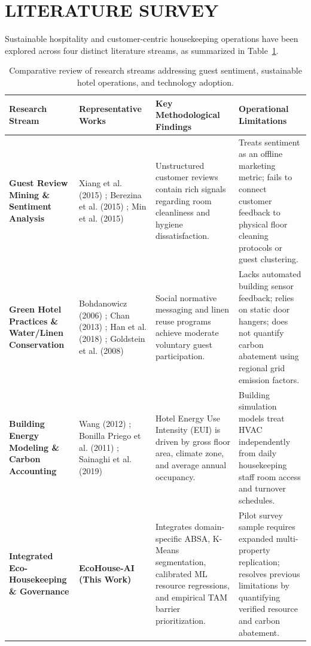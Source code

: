 \documentclass[11pt,a4paper]{article}
\begin{document}
\section{LITERATURE SURVEY}

Sustainable hospitality and customer-centric housekeeping operations have been explored across four distinct literature streams, as summarized in Table~\ref{tab:literature_review_matrix}.

\begin{table}[t]
\centering
\small
\caption{Comparative review of research streams addressing guest sentiment, sustainable hotel operations, and technology adoption.}
\label{tab:literature_review_matrix}
\begin{tabularx}{\textwidth}{>{\raggedright\arraybackslash}p{2.6cm} >{\raggedright\arraybackslash}p{3.0cm} X X}
\toprule
\textbf{Research Stream} & \textbf{Representative Works} & \textbf{Key Methodological Findings} & \textbf{Operational Limitations} \\
\midrule
\textbf{Guest Review Mining \& Sentiment Analysis} & 
Xiang et al. (2015) \cite{xiang2015}; Berezina et al. (2015) \cite{berezina2015}; Min et al. (2015) \cite{min2015} & 
Unstructured customer reviews contain rich signals regarding room cleanliness and hygiene dissatisfaction. & 
Treats sentiment as an offline marketing metric; fails to connect customer feedback to physical floor cleaning protocols or guest clustering. \\
\addlinespace
\textbf{Green Hotel Practices \& Water/Linen Conservation} & 
Bohdanowicz (2006) \cite{bohdanowicz2006}; Chan (2013) \cite{chan2013}; Han et al. (2018) \cite{han2018}; Goldstein et al. (2008) \cite{goldstein2008} & 
Social normative messaging and linen reuse programs achieve moderate voluntary guest participation. & 
Lacks automated building sensor feedback; relies on static door hangers; does not quantify carbon abatement using regional grid emission factors. \\
\addlinespace
\textbf{Building Energy Modeling \& Carbon Accounting} & 
Wang (2012) \cite{wang2012}; Bonilla Priego et al. (2011) \cite{bonilla2011}; Sainaghi et al. (2019) \cite{sainaghi2019} & 
Hotel Energy Use Intensity (EUI) is driven by gross floor area, climate zone, and average annual occupancy. & 
Building simulation models treat HVAC independently from daily housekeeping staff room access and turnover schedules. \\
\addlinespace
\textbf{Integrated Eco-Housekeeping \& Governance} & 
\textbf{EcoHouse-AI (This Work)} & 
Integrates domain-specific ABSA, K-Means segmentation, calibrated ML resource regressions, and empirical TAM barrier prioritization. & 
Pilot survey sample requires expanded multi-property replication; resolves previous limitations by quantifying verified resource and carbon abatement. \\
\bottomrule
\end{tabularx}
\end{table}
\end{document}

